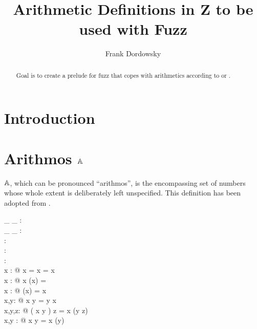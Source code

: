 \documentclass[12pt]{scrartcl}
\begin{document}
\title{Arithmetic Definitions in  Z to be used with Fuzz}

\author{Frank Dordowsky}

\maketitle

\begin{abstract}
Goal is to create a prelude for fuzz that copes with arithmetics
according to \cite{Valentine2012} or \cite{Arthan1996}.
\end{abstract}


\section{Introduction}
\label{sec:intro}

\section{Arithmos $\mathbb{A}$}
\label{sec:arithmos}

$\mathbb{A}$, which can be pronounced “arithmos”, is the encompassing
set of numbers whose whole extent is deliberately left
unspecified. This definition has been adopted from
\cite{Valentine2012}.

\begin{zed}
  [\arithmos] 
\end{zed}

\begin{axdef}
  \_ \aplus \_ : \arithmos \cross \arithmos \fun \arithmos\\
  \_ \aminus \_ : \arithmos \cross \arithmos \fun \arithmos\\
  \aneg : \arithmos \fun \arithmos\\
  \azero : \arithmos\\
  \aone : \arithmos\\
  \where
  \forall x : \arithmos @ x \aplus \azero = \azero \aplus x = x \\
  \forall x : \arithmos @ x \aplus (\aneg x) = \azero \\
  \forall x : \arithmos @ \aneg (\aneg x) = x \\
  \forall x,y: \arithmos @ x \aplus y = y \aplus x \\
  \forall x,y,z: \arithmos @ ( x \aplus y ) \aplus z = x \aplus (y
  \aplus z) \\
  \forall x,y : \arithmos @ x \aminus y = x \aplus (\aneg y)\\
\end{axdef}
\end{document}
